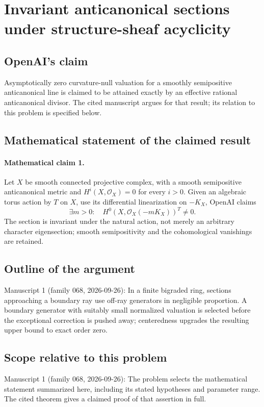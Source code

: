 \documentclass[11pt]{article}
\begin{document}
\section*{Invariant anticanonical sections under structure-sheaf acyclicity}

\subsection{OpenAI's claim}
Asymptotically zero curvature-null valuation for a smoothly semipositive anticanonical line is claimed to be attained exactly by an effective rational anticanonical divisor. The cited manuscript argues for that result; its relation to this problem is specified below.

\subsection{Mathematical statement of the claimed result}
\paragraph{Mathematical claim 1.} Let $X$ be smooth connected projective complex, with a smooth semipositive anticanonical metric and $H^i(X,\mathcal O_X)=0$ for every $i>0$. Given an algebraic torus action by $T$ on $X$, use its differential linearization on $-K_X$, OpenAI claims
\[
\exists m>0:\quad H^0(X,\mathcal O_X(-mK_X))^T\ne0.
\]
The section is invariant under the natural action, not merely an arbitrary character eigensection; smooth semipositivity and the cohomological vanishings are retained.

\subsection{Outline of the argument}
Manuscript 1 (family 068, 2026-09-26): In a finite bigraded ring, sections approaching a boundary ray use off-ray generators in negligible proportion. A boundary generator with suitably small normalized valuation is selected before the exceptional correction is pushed away; centeredness upgrades the resulting upper bound to exact order zero.

\subsection{Scope relative to this problem}
Manuscript 1 (family 068, 2026-09-26): The problem selects the mathematical statement summarized here, including its stated hypotheses and parameter range. The cited theorem gives a claimed proof of that assertion in full.
\end{document}

